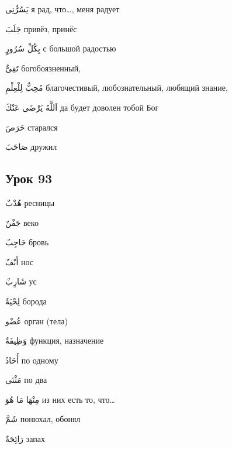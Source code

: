 \documentclass[a5paper]{article}
\newcommand\textstyleDropCaps[1]{#1}
\newcommand\textstyleCaptioncharacters[1]{#1}
\begin{document}
\textstyleCaptioncharacters{يَسُرُّنِى }\textstyleDropCaps{я рад, что…, меня радует‎}

\textstyleCaptioncharacters{جَلَبَ }\textstyleDropCaps{привёз, принёс‎}

\textstyleCaptioncharacters{بِكُلِّ سُرُورٍ }\textstyleDropCaps{с большой ра­достью‎}

\textstyleCaptioncharacters{تَقِىٌّ }\textstyleDropCaps{богобоязненный, ‎}

\textstyleCaptioncharacters{مُحِبٌّ لِلْعِلْمِ }\textstyleDropCaps{благоче­стивый, любознательный, любящий знание, ‎}

\textstyleCaptioncharacters{اَللَّهُ يَرْضَى عَنْكَ }\textstyleDropCaps{да бу­дет доволен тобой Бог‎}

\textstyleCaptioncharacters{حَرَصَ }\textstyleDropCaps{старался‎}

\textstyleCaptioncharacters{صَاحَبَ }\textstyleDropCaps{дружил‎}

\subsection[Урок 93‎]{\textstyleDropCaps{Урок 93‎}}
\textstyleCaptioncharacters{هُدْبٌ }\textstyleDropCaps{ресницы‎}

\textstyleCaptioncharacters{جَفْنٌ }\textstyleDropCaps{веко‎}

\textstyleCaptioncharacters{حَاجِبٌ }\textstyleDropCaps{бровь‎}

\textstyleCaptioncharacters{أَنْفٌ }\textstyleDropCaps{нос‎}

\textstyleCaptioncharacters{شَارِبٌ }\textstyleDropCaps{ус‎}

\textstyleCaptioncharacters{لِحْيَةٌ }\textstyleDropCaps{борода‎}

\textstyleCaptioncharacters{عُضْو }\textstyleDropCaps{орган (тела)‎}

\textstyleCaptioncharacters{وَظِيفَةٌ }\textstyleDropCaps{функция, назначе­ние‎}

\textstyleCaptioncharacters{أُحَادُ }\textstyleDropCaps{по одному‎}

\textstyleCaptioncharacters{مَثْنَى }\textstyleDropCaps{по два‎}

\textstyleCaptioncharacters{مِنْهَا مَا هُوَ }\textstyleDropCaps{из них есть то, что…‎}

\textstyleCaptioncharacters{شَمَّ }\textstyleDropCaps{понюхал, обонял‎}

\textstyleCaptioncharacters{رَائِحَةٌ }\textstyleDropCaps{запах‎}
\end{document}
